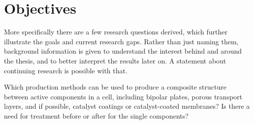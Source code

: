 \section{Objectives}
\label{sec:questions}
More specifically there are a few research questions derived, which further illustrate the goals and current research gaps. Rather than just naming them, background information is given to understand the interest behind and around the thesis, and to better interpret the results later on. A statement about continuing research is possible with that.

\vspace{12pt}
\begin{tcolorbox}[colback=dark-green!5!white,colframe=dark-green!75!black, toptitle=2mm, bottomtitle=2mm, top=5mm, bottom=5mm, title={\textbf{Research objective 1}}]
    Which production methods can be used to produce a composite structure between active components in a cell, including bipolar plates, porous transport layers, and if possible, catalyst coatings or catalyst-coated membranes? Is there a need for treatment before or after for the single components?
\end{tcolorbox}

